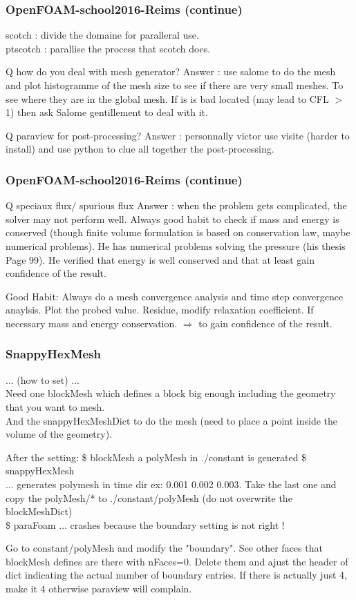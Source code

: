 \documentclass{beamer}
\begin{document}
\begin{frame}
\frametitle{OpenFOAM-school2016-Reims (continue)}
scotch : divide the domaine for paralleral use. \\
ptscotch : parallise the process that scotch does.

Q how do you deal with mesh generator?
Answer : use salome to do the mesh and plot histogramme of the mesh size to see if there are very small meshes. To see where they are in the global mesh. If is is bad located (may lead to CFL $>$ 1) then ask Salome gentillement to deal with it.

Q paraview for post-processing?
Answer : personnally victor use visite (harder to install) and use python to clue all together the post-processing.
\end{frame}

\begin{frame}
\frametitle{OpenFOAM-school2016-Reims (continue)}
Q speciaux flux/ spurious flux
Answer : when the problem gets complicated, the solver may not perform well. Always good habit to check if mass and energy is conserved (though finite volume formulation is based on conservation law, maybe numerical problems). He has numerical problems solving the pressure (his thesis Page 99). He verified that energy is well conserved and that at least gain confidence of the result.

Good Habit:
Always do a mesh convergence analysis and time step convergence anaylsis. Plot the probed value. Residue, modify relaxation coefficient.
If necessary mass and energy conservation.
$\Rightarrow$ to gain confidence of the result.
\end{frame}

\begin{frame}
\frametitle{SnappyHexMesh}
... (how to set) ... \\
Need one blockMesh which defines a block big enough including the geometry that you want to mesh.\\
And the snappyHexMeshDict to do the mesh (need to place a point inside the volume of the geometry).

After the setting:
\$ blockMesh
a polyMesh in ./constant is generated 
\$ snappyHexMesh \\
...
generates polymesh in time dir ex: 0.001 0.002 0.003.
Take the last one and copy the polyMesh/* to ./constant/polyMesh (do not overwrite the blockMeshDict)\\

\$ paraFoam ... crashes because the boundary setting is not right !

Go to constant/polyMesh and modify the "boundary". See other faces that blockMesh defines are there with nFaces=0. Delete them and ajust the header of dict indicating the actual number of boundary entries. If there is actually just 4, make it 4 otherwise paraview will complain.

\end{frame}
\end{document}
